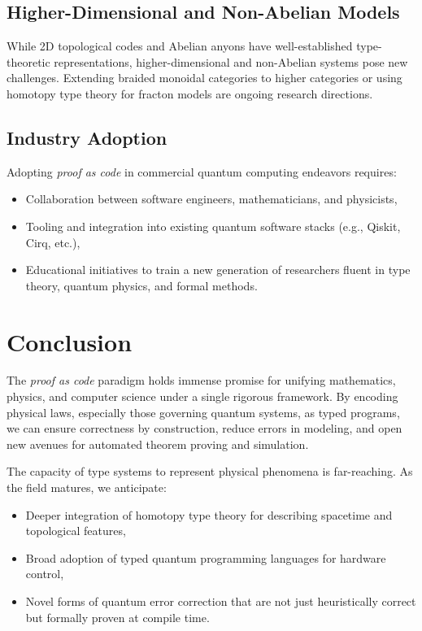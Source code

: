 \documentclass[12pt]{article}
\begin{document}
\subsection{Higher-Dimensional and Non-Abelian Models}
While 2D topological codes and Abelian anyons have well-established type-theoretic representations, higher-dimensional and non-Abelian systems pose new challenges. Extending braided monoidal categories to higher categories or using homotopy type theory for fracton models are ongoing research directions.

\subsection{Industry Adoption}
Adopting \emph{proof as code} in commercial quantum computing endeavors requires:
\begin{itemize}[label=$\bullet$]
    \item Collaboration between software engineers, mathematicians, and physicists,
    \item Tooling and integration into existing quantum software stacks (e.g., Qiskit, Cirq, etc.),
    \item Educational initiatives to train a new generation of researchers fluent in type theory, quantum physics, and formal methods.
\end{itemize}

\section{Conclusion}
\label{sec:conclusion}
The \emph{proof as code} paradigm holds immense promise for unifying mathematics, physics, and computer science under a single rigorous framework. By encoding physical laws, especially those governing quantum systems, as typed programs, we can ensure correctness by construction, reduce errors in modeling, and open new avenues for automated theorem proving and simulation.

The capacity of type systems to represent physical phenomena is far-reaching. As the field matures, we anticipate:
\begin{itemize}[label=$\bullet$]
    \item Deeper integration of homotopy type theory for describing spacetime and topological features,
    \item Broad adoption of typed quantum programming languages for hardware control,
    \item Novel forms of quantum error correction that are not just heuristically correct but formally proven at compile time.
\end{itemize}
\end{document}
